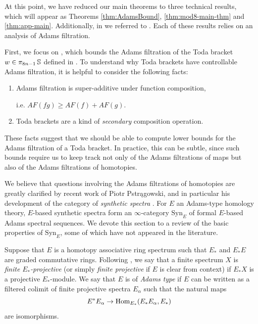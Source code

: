 At this point, we have reduced our main theorems to three technical results, which will appear as Theorems \ref{thm:AdamsBound}, \ref{thm:mod8-main-thm} and \ref{thm:app-main}.
Additionally, in  we referred to .
Each of these results relies on an analysis of Adams filtration.

First, we focus on , which bounds the Adams filtration of the Toda bracket $w \in \pi_{8n-1} \operatorname{\mathbb{S}}$ defined in .
To understand why Toda brackets have controllable Adams filtration, it is helpful to consider the following facts:
\begin{enumerate}
\item Adams filtration is super-additive under function composition,

  \noindent i.e. $AF(fg) \geq AF(f) + AF(g)$.
\item Toda brackets are a kind of \emph{secondary} composition operation.
\end{enumerate}
These facts suggest that we should be able to compute lower bounds for the Adams filtration of a Toda bracket. In practice, this can be subtle, since such bounds require us to keep track not only of the Adams filtrations of maps but also of the Adams filtrations of homotopies.

We believe that questions involving the Adams filtrations of homotopies are greatly clarified by recent work of Piotr Pstr\k{a}gowski, and in particular his development of the category of \emph{synthetic spectra} \cite{Pstragowski}. For $E$ an Adams-type homology theory, $E$-based synthetic spectra form an $\infty$-category $\mathrm{Syn}_{E}$ of formal $E$-based Adams spectral sequences.  We devote this section to a review of the basic properties of $\mathrm{Syn}_E$, some of which have not appeared in the literature.

\begin{dfn}
  Suppose that $E$ is a homotopy associative ring spectrum such that $E_*$ and $E_*E$ are graded commutative rings. Following \cite[Definition 3.12]{Pstragowski}, we say that a finite spectrum $X$ is \emph{finite $E_*$-projective} (or simply \emph{finite projective} if $E$ is clear from context) if $E_*X$ is a projective $E_*$-module.
  We say that $E$ is of \emph{Adams type} if $E$ can be written as a filtered colimit of finite projective spectra $E_\alpha$ such that the natural maps $$E^*E_\alpha \to \operatorname{\mathrm{Hom}}_{E_*}(E_*E_\alpha, E_*)$$ are isomorphisms.
\end{dfn}

